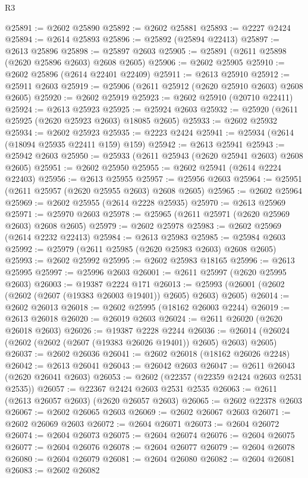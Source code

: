\begin{lexlean}{R3}
\begin{coremodule}
@25891 := @2602 @25890
@25892 := @2602 @25881
@25893 := @2227 @2424
@25894 := @2614 @25893
@25896 := @25892 (@25894 @22413)
@25897 := @2613 @25896
@25898 := @25897 @2603
@25905 := @25891 (@2611 @25898 (@2620 @25896 @2603) @2608 @2605)
@25906 := @2602 @25905
@25910 := @2602 @25896 (@2614 @22401 @22409)
@25911 := @2613 @25910
@25912 := @25911 @2603
@25919 := @25906 (@2611 @25912 (@2620 @25910 @2603) @2608 @2605)
@25920 := @2602 @25919
@25923 := @2602 @25910 (@20710 @22411)
@25924 := @2613 @25923
@25925 := @25924 @2603
@25932 := @25920 (@2611 @25925 (@2620 @25923 @2603) @18085 @2605)
@25933 := @2602 @25932
@25934 := @2602 @25923
@25935 := @2223 @2424
@25941 := @25934 (@2614 (@18094 @25935 @22411 @159) @159)
@25942 := @2613 @25941
@25943 := @25942 @2603
@25950 := @25933 (@2611 @25943 (@2620 @25941 @2603) @2608 @2605)
@25951 := @2602 @25950
@25955 := @2602 @25941 (@2614 @2224 @22403)
@25956 := @2613 @25955
@25957 := @25956 @2603
@25964 := @25951 (@2611 @25957 (@2620 @25955 @2603) @2608 @2605)
@25965 := @2602 @25964
@25969 := @2602 @25955 (@2614 @2228 @25935)
@25970 := @2613 @25969
@25971 := @25970 @2603
@25978 := @25965 (@2611 @25971 (@2620 @25969 @2603) @2608 @2605)
@25979 := @2602 @25978
@25983 := @2602 @25969 (@2614 @2232 @22413)
@25984 := @2613 @25983
@25985 := @25984 @2603
@25992 := @25979 (@2611 @25985 (@2620 @25983 @2603) @2608 @2605)
@25993 := @2602 @25992
@25995 := @2602 @25983 @18165
@25996 := @2613 @25995
@25997 := @25996 @2603
@26001 := @2611 @25997 (@2620 @25995 @2603)
@26003 := @19387 @2224 @171
@26013 := @25993 (@26001 (@2602 (@2602 (@2607 (@19383 @26003 @19401)) @2605) @2603) @2605)
@26014 := @2602 @26013
@26018 := @2602 @25995 (@18162 @26003 @2244)
@26019 := @2613 @26018
@26020 := @26019 @2603
@26024 := @2611 @26020 (@2620 @26018 @2603)
@26026 := @19387 @2228 @2244
@26036 := @26014 (@26024 (@2602 (@2602 (@2607 (@19383 @26026 @19401)) @2605) @2603) @2605)
@26037 := @2602 @26036
@26041 := @2602 @26018 (@18162 @26026 @2248)
@26042 := @2613 @26041
@26043 := @26042 @2603
@26047 := @2611 @26043 (@2620 @26041 @2603)
@26053 := @2602 (@22357 (@22359 @2424 @2603 @2531 @2535))
@26057 := @22367 @2424 @2603 @2531 @2535
@26063 := @2611 (@2613 @26057 @2603) (@2620 @26057 @2603)
@26065 := @2602 @22378 @2603
@26067 := @2602 @26065 @2603
@26069 := @2602 @26067 @2603
@26071 := @2602 @26069 @2603
@26072 := @2604 @26071
@26073 := @2604 @26072
@26074 := @2604 @26073
@26075 := @2604 @26074
@26076 := @2604 @26075
@26077 := @2604 @26076
@26078 := @2604 @26077
@26079 := @2604 @26078
@26080 := @2604 @26079
@26081 := @2604 @26080
@26082 := @2604 @26081
@26083 := @2602 @26082

\end{coremodule}
\end{lexlean}
